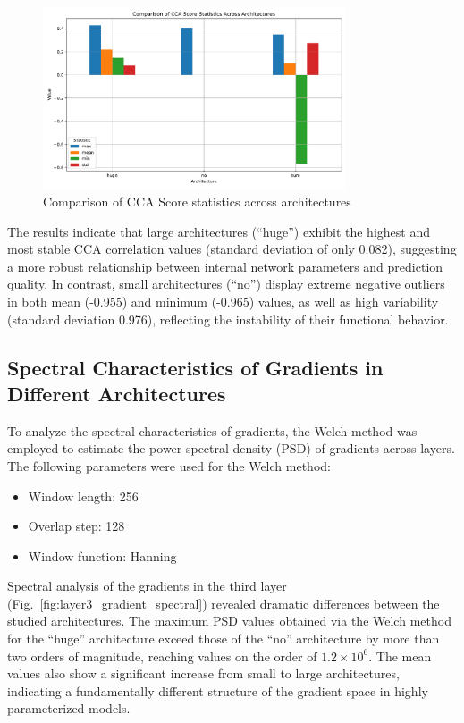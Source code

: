 \documentclass[a4paper,12pt]{article}
\begin{document}
\begin{figure}[ht]
  \centering
  \includegraphics[width=0.8\textwidth]{resources_en/cca_score_statistics_comparison.pdf}
  \caption{Comparison of CCA Score statistics across architectures}
  \label{fig:cca_score_comparison}
\end{figure}

The results indicate that large architectures (``huge'') exhibit the highest and most stable CCA correlation
values (standard deviation of only 0.082), suggesting a more robust relationship between internal network
parameters and prediction quality. In contrast, small architectures (``no'') display extreme negative
outliers in both mean (-0.955) and minimum (-0.965) values, as well as high variability (standard deviation
0.976), reflecting the instability of their functional behavior.

\subsection{Spectral Characteristics of Gradients in Different Architectures}

To analyze the spectral characteristics of gradients, the Welch method was employed to estimate the power
spectral density (PSD) of gradients across layers. The following parameters were used for the Welch method:
\begin{itemize}
  \item Window length: 256
  \item Overlap step: 128
  \item Window function: Hanning
\end{itemize}

Spectral analysis of the gradients in the third layer (Fig.~\ref{fig:layer3_gradient_spectral}) revealed
dramatic differences between the studied architectures. The maximum PSD values obtained via the Welch method
for the ``huge'' architecture exceed those of the ``no'' architecture by more than two orders of magnitude,
reaching values on the order of $1.2\times10^6$. The mean values also show a significant increase from small
to large architectures, indicating a fundamentally different structure of the gradient space in highly
parameterized models.
\end{document}
